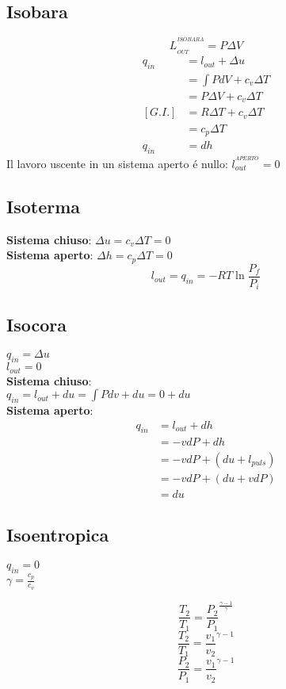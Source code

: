 \documentclass[landscape,a4paper]{article}
\begin{document}
\begin{multicols}{4}
\subsection*{Isobara}
\[L_{_{OUT}}^{^{ISOBARA}}= P \Delta V \]
\begin{align*}
	q_{in} &= l_{out} + \Delta u \\
	&= \int PdV + c_v\Delta T \\
	&= P\Delta V + c_v\Delta T \\
	[G.I.] &= R\Delta T + c_v \Delta T \\
	&= c_p \Delta T \\
	q_{in}&= dh
\end{align*} 
Il lavoro uscente in un sistema aperto é nullo: \(l_{out}^{^{APERTO}}=0\)


\subsection*{Isoterma}
\textbf{Sistema chiuso}: \(\Delta u = c_v\Delta T = 0\) \\
\textbf{Sistema aperto}: \(\Delta h = c_p\Delta T = 0\)
\[ l_{out} = q_{in} = -RT\ln\frac{P_f}{P_i}\]

\subsection*{Isocora}
\(q_{in} = \Delta u\)\\ \(l_{out} = 0\) \\
\textbf{Sistema chiuso}: \\
\(q_{in} = l_{out} + du = \int Pdv + du = 0 + du\) \\
\textbf{Sistema aperto}:
\begin{align*}
	q_{in} &= l_{out} + dh \\
	&= -vdP + dh \\
	&= -vdP + (du + l_{puls}) \\
	&= -vdP + (du + vdP) \\
	&= du	
\end{align*}


\subsection*{Isoentropica}

\begin{center}
	\(q_{in} = 0\) \\	
	\( \gamma = \frac{c_p}{c_v} \)
\end{center}
\begin{multicols}{3}
\noindent
\[\frac{T_2}{T_1}=\frac{P_2}{P_1}^{\frac{\gamma -1}{\gamma}}\]
\[\frac{T_2}{T_1}=\frac{v_1}{v_2}^{\gamma -1}\]
\[\frac{P_2}{P_1}=\frac{v_1}{v_2}^{\gamma -1}\]
\end{multicols}


\end{multicols}
\end{document}
